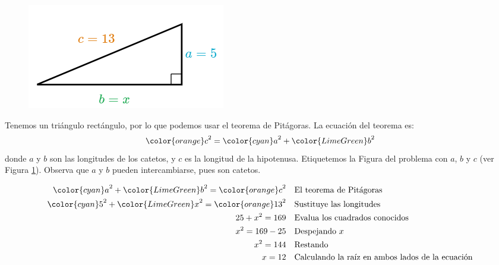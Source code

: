 \begin{minipage}[t][][t]{0.6\textwidth}
    \begin{solutionbox}{9.5cm}
        \begin{minipage}{0.4\textwidth}
            \begin{figure}[H]
                \centering
                \includegraphics[width=0.9\linewidth]{../images/lados_pitagoras_23a.png}
                \caption{}
                \label{fig:lados_pitagoras_23a}
            \end{figure}
        \end{minipage}\hfill
        \begin{minipage}{0.55\textwidth}
            Tenemos un triángulo rectángulo, por lo que podemos usar el teorema de Pitágoras.
            La ecuación del teorema es:
            \[{\color{orange}c}^2={\color{cyan}a}^2+{\color{LimeGreen}b}^2\]
            donde $a$ y $b$ son las longitudes de los catetos, y $c$ es la longitud de la hipotenusa.
            Etiquetemos la Figura del problema con $a$, $b$ y $c$ (ver Figura \ref{fig:lados_pitagoras_23a}).
            Observa que $a$ y $b$ pueden intercambiarse, pues son catetos.
        \end{minipage}
        \begin{align*}
            {\color{cyan}a}^2+{\color{LimeGreen}b}^2  ={\color{orange}c}^2  & \text{\quad El teorema de Pitágoras}                          \\
            {\color{cyan}5}^2+{\color{LimeGreen}x}^2  ={\color{orange}13}^2 & \text{\quad Sustituye las longitudes}                         \\
            25+x^2  =169                                                    & \text{\quad Evalua los cuadrados conocidos}                   \\
            x^2=169-25                                                      & \text{\quad Despejando } x                                    \\
            x^2=144                                                         & \text{\quad Restando}                                         \\
            x=12                                                            & \text{\quad Calculando la raíz en ambos lados de la ecuación} \\
        \end{align*}
    \end{solutionbox}
\end{minipage}
